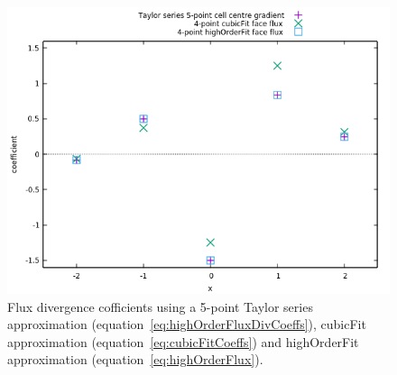 \documentclass{article}
\begin{document}
\begin{figure}
	\centering
	\includegraphics[width=5in]{interim-results/taylor-series.png}
	\caption{Flux divergence cofficients using a 5-point Taylor series approximation (equation~\ref{eq:highOrderFluxDivCoeffs}), cubicFit approximation (equation~\ref{eq:cubicFitCoeffs}) and highOrderFit approximation (equation~\ref{eq:highOrderFlux}).}
	\label{fig:fluxDivComparison}
\end{figure}



\end{document}
